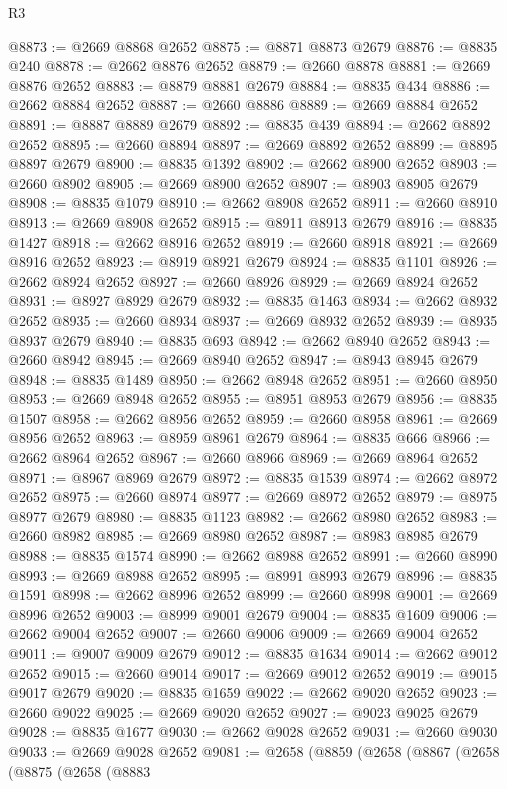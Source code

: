 \begin{lexlean}{R3}
\begin{coremodule}
@8873 := @2669 @8868 @2652
@8875 := @8871 @8873 @2679
@8876 := @8835 @240
@8878 := @2662 @8876 @2652
@8879 := @2660 @8878
@8881 := @2669 @8876 @2652
@8883 := @8879 @8881 @2679
@8884 := @8835 @434
@8886 := @2662 @8884 @2652
@8887 := @2660 @8886
@8889 := @2669 @8884 @2652
@8891 := @8887 @8889 @2679
@8892 := @8835 @439
@8894 := @2662 @8892 @2652
@8895 := @2660 @8894
@8897 := @2669 @8892 @2652
@8899 := @8895 @8897 @2679
@8900 := @8835 @1392
@8902 := @2662 @8900 @2652
@8903 := @2660 @8902
@8905 := @2669 @8900 @2652
@8907 := @8903 @8905 @2679
@8908 := @8835 @1079
@8910 := @2662 @8908 @2652
@8911 := @2660 @8910
@8913 := @2669 @8908 @2652
@8915 := @8911 @8913 @2679
@8916 := @8835 @1427
@8918 := @2662 @8916 @2652
@8919 := @2660 @8918
@8921 := @2669 @8916 @2652
@8923 := @8919 @8921 @2679
@8924 := @8835 @1101
@8926 := @2662 @8924 @2652
@8927 := @2660 @8926
@8929 := @2669 @8924 @2652
@8931 := @8927 @8929 @2679
@8932 := @8835 @1463
@8934 := @2662 @8932 @2652
@8935 := @2660 @8934
@8937 := @2669 @8932 @2652
@8939 := @8935 @8937 @2679
@8940 := @8835 @693
@8942 := @2662 @8940 @2652
@8943 := @2660 @8942
@8945 := @2669 @8940 @2652
@8947 := @8943 @8945 @2679
@8948 := @8835 @1489
@8950 := @2662 @8948 @2652
@8951 := @2660 @8950
@8953 := @2669 @8948 @2652
@8955 := @8951 @8953 @2679
@8956 := @8835 @1507
@8958 := @2662 @8956 @2652
@8959 := @2660 @8958
@8961 := @2669 @8956 @2652
@8963 := @8959 @8961 @2679
@8964 := @8835 @666
@8966 := @2662 @8964 @2652
@8967 := @2660 @8966
@8969 := @2669 @8964 @2652
@8971 := @8967 @8969 @2679
@8972 := @8835 @1539
@8974 := @2662 @8972 @2652
@8975 := @2660 @8974
@8977 := @2669 @8972 @2652
@8979 := @8975 @8977 @2679
@8980 := @8835 @1123
@8982 := @2662 @8980 @2652
@8983 := @2660 @8982
@8985 := @2669 @8980 @2652
@8987 := @8983 @8985 @2679
@8988 := @8835 @1574
@8990 := @2662 @8988 @2652
@8991 := @2660 @8990
@8993 := @2669 @8988 @2652
@8995 := @8991 @8993 @2679
@8996 := @8835 @1591
@8998 := @2662 @8996 @2652
@8999 := @2660 @8998
@9001 := @2669 @8996 @2652
@9003 := @8999 @9001 @2679
@9004 := @8835 @1609
@9006 := @2662 @9004 @2652
@9007 := @2660 @9006
@9009 := @2669 @9004 @2652
@9011 := @9007 @9009 @2679
@9012 := @8835 @1634
@9014 := @2662 @9012 @2652
@9015 := @2660 @9014
@9017 := @2669 @9012 @2652
@9019 := @9015 @9017 @2679
@9020 := @8835 @1659
@9022 := @2662 @9020 @2652
@9023 := @2660 @9022
@9025 := @2669 @9020 @2652
@9027 := @9023 @9025 @2679
@9028 := @8835 @1677
@9030 := @2662 @9028 @2652
@9031 := @2660 @9030
@9033 := @2669 @9028 @2652
@9081 := @2658
    (@8859
      (@2658
        (@8867
          (@2658
            (@8875
              (@2658
                (@8883

\end{coremodule}
\end{lexlean}
